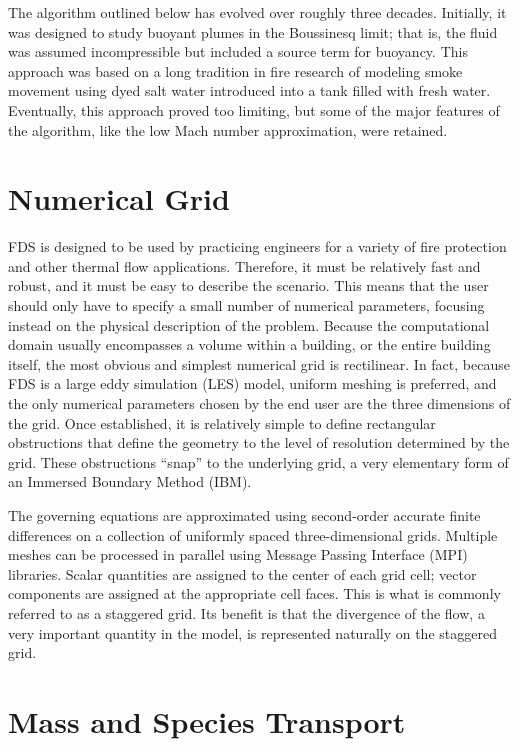 The algorithm outlined below has evolved over roughly three decades. Initially, it was designed to study buoyant plumes in the
Boussinesq limit; that is, the fluid was assumed incompressible but included a source term for buoyancy. This approach was based
on a long tradition in fire research of modeling smoke movement using dyed salt water introduced into a tank filled with fresh
water. Eventually, this approach proved too limiting, but some of the major features of the algorithm, like the low
Mach number approximation, were retained.

\section{Numerical Grid}
\label{govequations}

FDS is designed to be used by practicing engineers for a variety of fire protection and other thermal flow applications.
Therefore, it must be relatively fast and robust, and it must be easy to describe the scenario. This means that the user
should only have to specify a small number of numerical parameters, focusing instead on the physical description of the
problem. Because the
computational domain usually encompasses a volume within a building, or the entire building itself, the
most obvious and simplest numerical grid is rectilinear.
In fact, because FDS is a large eddy simulation (LES) model, uniform meshing is
preferred, and the only numerical parameters chosen by the end user are the three dimensions of the grid. Once established, it
is relatively simple to define rectangular obstructions that define the geometry to the level of resolution determined by the
grid. These obstructions ``snap'' to the underlying grid, a very elementary form of an Immersed Boundary Method (IBM).

The governing equations are approximated using second-order accurate finite differences on a collection of uniformly
spaced three-dimensional grids. Multiple meshes can be processed in parallel using Message Passing Interface (MPI) libraries.
Scalar quantities are assigned to the center of each grid cell;
vector components are assigned at the appropriate cell faces. This is what is commonly referred to as a staggered grid. Its
benefit is that the divergence of the flow, a very important quantity in the model, is represented naturally on the
staggered grid.

\section{Mass and Species Transport}


